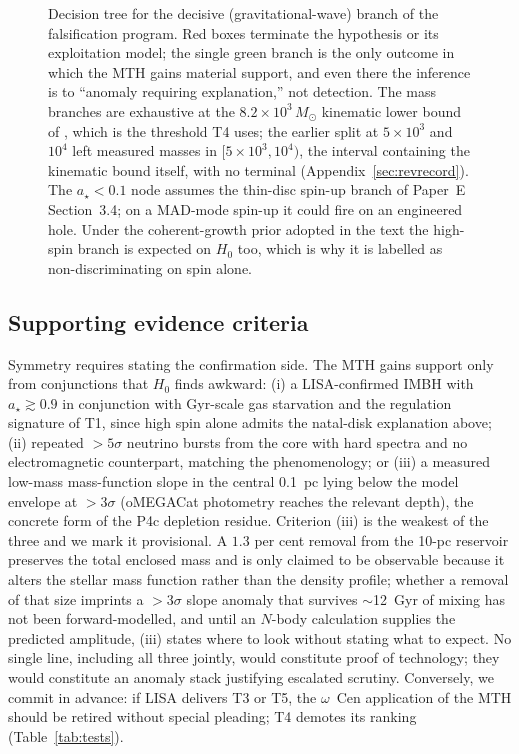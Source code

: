 \documentclass[11pt]{article}
\newcommand{\msun}{\ensuremath{M_\odot}}
\newcommand{\astar}{\ensuremath{a_\star}}
\begin{document}
\begin{figure}[tbp]
\caption{Decision tree for the decisive (gravitational-wave) branch of the falsification program. Red boxes terminate the hypothesis or its exploitation model; the single green branch is the only outcome in which the MTH gains material support, and even there the inference is to ``anomaly requiring explanation,'' not detection. The mass branches are exhaustive at the $8.2\times10^{3}\,\msun$ kinematic lower bound of \citet{Haberle2024Nature}, which is the threshold T4 uses; the earlier split at $5\times10^{3}$ and $10^{4}$ left measured masses in $[5\times10^{3}, 10^{4})$, the interval containing the kinematic bound itself, with no terminal (Appendix~\ref{sec:revrecord}). The $\astar < 0.1$ node assumes the thin-disc spin-up branch of Paper~E Section~3.4; on a MAD-mode spin-up it could fire on an engineered hole. Under the coherent-growth prior adopted in the text the high-spin branch is expected on $H_0$ too, which is why it is labelled as non-discriminating on spin alone.}
\label{fig:tree}
\end{figure}

\subsection{Supporting evidence criteria}

Symmetry requires stating the confirmation side. The MTH gains support only from conjunctions that $H_0$ finds awkward: (i) a LISA-confirmed IMBH with $\astar \gtrsim 0.9$ in conjunction with Gyr-scale gas starvation and the regulation signature of T1, since high spin alone admits the natal-disk explanation above; (ii) repeated $>5\sigma$ neutrino bursts from the core with hard spectra and no electromagnetic counterpart, matching the \citet{Dvali2023} phenomenology; or (iii) a measured low-mass mass-function slope in the central 0.1~pc lying below the \citet{GonzalezPrieto2025} model envelope at $>3\sigma$ (oMEGACat photometry reaches the relevant depth), the concrete form of the P4c depletion residue. Criterion (iii) is the weakest of the three and we mark it provisional. A $1.3$ per cent removal from the 10-pc reservoir preserves the total enclosed mass and is only claimed to be observable because it alters the stellar mass function rather than the density profile; whether a removal of that size imprints a $>3\sigma$ slope anomaly that survives $\sim$12~Gyr of mixing has not been forward-modelled, and until an $N$-body calculation supplies the predicted amplitude, (iii) states where to look without stating what to expect. No single line, including all three jointly, would constitute proof of technology; they would constitute an anomaly stack justifying escalated scrutiny. Conversely, we commit in advance: if LISA delivers T3 or T5, the $\omega$~Cen application of the MTH should be retired without special pleading; T4 demotes its ranking (Table~\ref{tab:tests}).
\end{document}
